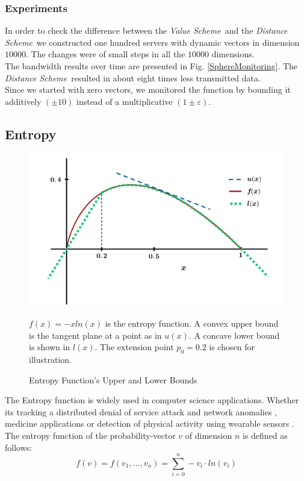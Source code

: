 \documentclass[10pt, conference]{IEEEtran}
\newcommand{\valueScheme}{\textit{Value Scheme}}
\newcommand{\distanceScheme}{\textit{Distance Scheme}}
\begin{document}
\subsubsection{Experiments}
In order to check the difference between the \valueScheme \ and the \distanceScheme \ we constructed one hundred servers with dynamic vectors in dimension $\num[group-separator={,}]{10000}$. The changes were of small steps in all the $\num[group-separator={,}]{10000}$ dimensions. \\
The bandwidth results over time are presented in Fig. \ref{SphereMonitoring}. The \distanceScheme \ resulted in about eight times less transmitted data. \\
Since we started with zero vectors, we monitored the function by bounding it additively ${(\pm 10)}$ instead of a multiplicative ${(1 \pm \varepsilon)}$.

\subsection{Entropy}
\begin{figure}[b]
\includegraphics[width=0.85\linewidth]{Pics/PNGs/EntropyBounds.png}
\caption{Entropy Function's Upper and Lower Bounds}
\label{EntropyBoundsFigure}
\medskip
\small
${f(x) = -xln(x)}$ is the entropy function. A convex upper bound is the tangent plane at a point as in $u(x)$. A concave lower bound is shown in $l(x)$. The extension point $p_0 = 0.2$ is chosen for illustration.
\end{figure}
The Entropy function is widely used in computer science applications. Whether its tracking a distributed denial of service attack and network anomalies \cite{arackaparambil2010distributed}, medicine applications \cite{anderson2004entropy} or detection of physical activity using wearable sensors \cite{ermes2008detection}. \\
The entropy function of the probability-vector $v$ of dimension $n$ is defined as follows:
\begin{equation}
f(v) = f(v_1,...,v_n)=\sum\limits_{i=0}^n -v_i \cdot ln(v_i)
\end{equation}
\end{document}
